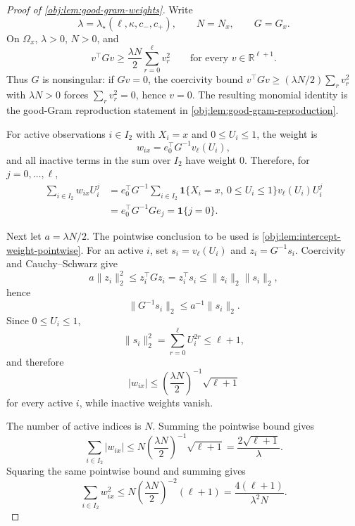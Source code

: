 \begin{proof}[Proof of \cref{obj:lem:good-gram-weights}]
Write
\[
        \lambda=\lambda_\star(\ell,\kappa,c_-,c_+),
        \qquad
        N=N_x,
        \qquad
        G=G_x .
\]
On \(\Omega_x\), \(\lambda>0\), \(N>0\), and
\[
        v^\top Gv\ge \frac{\lambda N}{2}\sum_{r=0}^{\ell}v_r^2
        \qquad\text{for every }v\in\mathbb R^{\ell+1}.
\]
Thus \(G\) is nonsingular: if \(Gv=0\), the coercivity bound \(v^\top Gv\ge(\lambda N/2)\sum_r v_r^2\) with \(\lambda N>0\) forces \(\sum_r v_r^2=0\), hence \(v=0\).  The resulting monomial identity is the good-Gram reproduction statement in \cref{obj:lem:good-gram-reproduction}. %

For active observations \(i\in I_2\) with \(X_i=x\) and \(0\le U_i\le1\), the weight is
\[
        w_{ix}=e_0^\top G^{-1}v_\ell(U_i),
\]
and all inactive terms in the sum over \(I_2\) have weight \(0\).  Therefore, for \(j=0,\ldots,\ell\),
\[
\begin{aligned}
\sum_{i\in I_2} w_{ix}U_i^j
&=
e_0^\top G^{-1}
\sum_{i\in I_2}
\mathbf 1\{X_i=x,\ 0\le U_i\le1\}v_\ell(U_i)U_i^j  \\
&=
e_0^\top G^{-1}G e_j
=
\mathbf 1\{j=0\}.
\end{aligned}
\]

Next let \(a=\lambda N/2\).  The pointwise conclusion to be used is \cref{obj:lem:intercept-weight-pointwise}.  For an active \(i\), set \(s_i=v_\ell(U_i)\) and \(z_i=G^{-1}s_i\).  Coercivity and Cauchy--Schwarz give
\[
        a\|z_i\|_2^2
        \le z_i^\top Gz_i
        = z_i^\top s_i
        \le \|z_i\|_2\|s_i\|_2,
\]
hence
\[
        \|G^{-1}s_i\|_2\le a^{-1}\|s_i\|_2 .
\]
Since \(0\le U_i\le1\),
\[
        \|s_i\|_2^2=\sum_{r=0}^{\ell}U_i^{2r}\le \ell+1,
\]
and therefore
\[
        |w_{ix}|
        \le
        \left(\frac{\lambda N}{2}\right)^{-1}\sqrt{\ell+1}
\]
for every active \(i\), while inactive weights vanish. %

The number of active indices is \(N\).  Summing the pointwise bound gives
\[
        \sum_{i\in I_2}|w_{ix}|
        \le
        N\left(\frac{\lambda N}{2}\right)^{-1}\sqrt{\ell+1}
        =
        \frac{2\sqrt{\ell+1}}{\lambda}.
\]
Squaring the same pointwise bound and summing gives
\[
        \sum_{i\in I_2}w_{ix}^2
        \le
        N\left(\frac{\lambda N}{2}\right)^{-2}(\ell+1)
        =
        \frac{4(\ell+1)}{\lambda^2N}.
\]
\end{proof}
